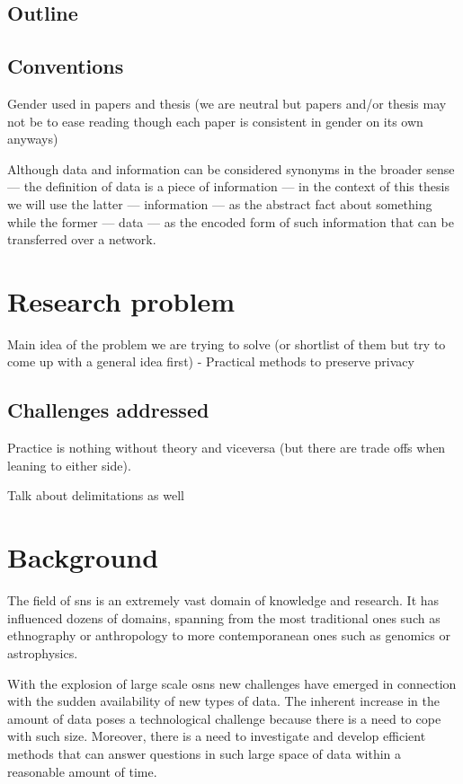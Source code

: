 \documentclass[showtrims]{kthesis}
\begin{document}
\section{Outline}

\section{Conventions}
Gender used in papers and thesis (we are neutral but papers and/or thesis may not 
be to ease reading though each paper is consistent in gender on its own anyways)

Although data and information can be considered synonyms in the broader sense 
--- the definition of data is a piece of information --- in the context of this 
thesis we will use the latter --- information --- as the abstract fact about something 
while the former --- data --- as the encoded form of such information that can be 
transferred over a network.


\chapter{Research problem}
Main idea of the problem we are trying to solve (or shortlist of them but try to come up with a general idea first)
- Practical methods to preserve privacy

\section{Challenges addressed}
Practice is nothing without theory and viceversa (but there are trade offs when leaning to either side).

Talk about delimitations as well


\chapter{Background}
The field of \acp{sn} is an extremely vast domain of knowledge and research. It 
has influenced dozens of domains, spanning from the most traditional ones such as 
ethnography or anthropology to more contemporanean ones such as genomics or astrophysics.


With the explosion of large scale \acp{osn} new challenges have emerged in connection 
with the sudden availability of new types of data. The inherent increase in the 
amount of data poses a technological challenge because there is a need to cope with 
such size. Moreover, there is a need to investigate and develop efficient methods 
that can answer questions in such large space of data within a reasonable amount 
of time.
\end{document}
